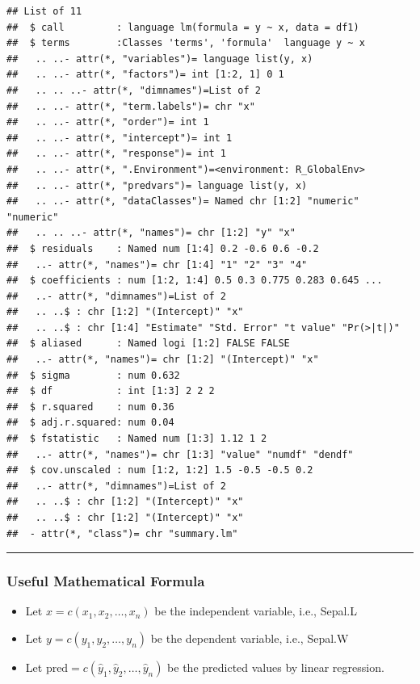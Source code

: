 \documentclass[
]{article}
\providecommand{\tightlist}{%
  \setlength{\itemsep}{0pt}\setlength{\parskip}{0pt}}
\begin{document}
\begin{verbatim}
## List of 11
##  $ call         : language lm(formula = y ~ x, data = df1)
##  $ terms        :Classes 'terms', 'formula'  language y ~ x
##   .. ..- attr(*, "variables")= language list(y, x)
##   .. ..- attr(*, "factors")= int [1:2, 1] 0 1
##   .. .. ..- attr(*, "dimnames")=List of 2
##   .. ..- attr(*, "term.labels")= chr "x"
##   .. ..- attr(*, "order")= int 1
##   .. ..- attr(*, "intercept")= int 1
##   .. ..- attr(*, "response")= int 1
##   .. ..- attr(*, ".Environment")=<environment: R_GlobalEnv> 
##   .. ..- attr(*, "predvars")= language list(y, x)
##   .. ..- attr(*, "dataClasses")= Named chr [1:2] "numeric" "numeric"
##   .. .. ..- attr(*, "names")= chr [1:2] "y" "x"
##  $ residuals    : Named num [1:4] 0.2 -0.6 0.6 -0.2
##   ..- attr(*, "names")= chr [1:4] "1" "2" "3" "4"
##  $ coefficients : num [1:2, 1:4] 0.5 0.3 0.775 0.283 0.645 ...
##   ..- attr(*, "dimnames")=List of 2
##   .. ..$ : chr [1:2] "(Intercept)" "x"
##   .. ..$ : chr [1:4] "Estimate" "Std. Error" "t value" "Pr(>|t|)"
##  $ aliased      : Named logi [1:2] FALSE FALSE
##   ..- attr(*, "names")= chr [1:2] "(Intercept)" "x"
##  $ sigma        : num 0.632
##  $ df           : int [1:3] 2 2 2
##  $ r.squared    : num 0.36
##  $ adj.r.squared: num 0.04
##  $ fstatistic   : Named num [1:3] 1.12 1 2
##   ..- attr(*, "names")= chr [1:3] "value" "numdf" "dendf"
##  $ cov.unscaled : num [1:2, 1:2] 1.5 -0.5 -0.5 0.2
##   ..- attr(*, "dimnames")=List of 2
##   .. ..$ : chr [1:2] "(Intercept)" "x"
##   .. ..$ : chr [1:2] "(Intercept)" "x"
##  - attr(*, "class")= chr "summary.lm"
\end{verbatim}

\begin{center}\rule{0.5\linewidth}{0.5pt}\end{center}

\hypertarget{useful-mathematical-formula}{%
\subsubsection{Useful Mathematical
Formula}\label{useful-mathematical-formula}}

\begin{itemize}
\tightlist
\item
  Let \(x = c(x_1, x_2, \ldots, x_n)\) be the independent variable,
  i.e., Sepal.L
\item
  Let \(y = c(y_1, y_2, \ldots, y_n)\) be the dependent variable, i.e.,
  Sepal.W
\item
  Let \(\mbox{pred} = c(\hat{y}_1, \hat{y}_2, \ldots, \hat{y}_n)\) be
  the predicted values by linear regression.
\end{itemize}
\end{document}
